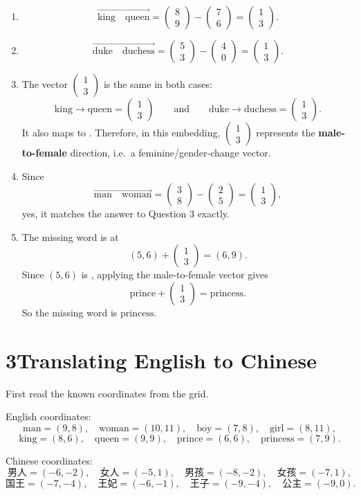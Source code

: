 \documentclass[12pt]{ctexart}
\newcommand{\overarrow}[1]{\overrightarrow{#1}}
\newcommand{\colvec}[2]{\begin{pmatrix} #1 \\ #2 \end{pmatrix}}
\begin{document}
\begin{enumerate}[label=\textbf{\arabic*.}]
\item \[
\overarrow{\text{king}\quad\text{queen}}
=\colvec{8}{9}-\colvec{7}{6}
=\colvec{1}{3}.
\]

\item \[
\overarrow{\text{duke}\quad\text{duchess}}
=\colvec{5}{3}-\colvec{4}{0}
=\colvec{1}{3}.
\]

\item The vector \(\colvec{1}{3}\) is the same in both cases:
\[
\text{king}\to\text{queen}=\colvec{1}{3}
\qquad\text{and}\qquad
\text{duke}\to\text{duchess}=\colvec{1}{3}.
\]
It also maps  to . Therefore, in this embedding, \(\colvec{1}{3}\) represents the \textbf{male-to-female} direction, i.e.\ a feminine/gender-change vector.

\item Since
\[
\overarrow{\text{man}\quad\text{woman}}
=\colvec{3}{8}-\colvec{2}{5}
=\colvec{1}{3},
\]
yes, it matches the answer to Question 3 exactly.

\item The missing word is at
\[
(5,6)+\colvec{1}{3}=(6,9).
\]
Since \((5,6)\) is , applying the male-to-female vector gives
\[
\text{prince}+\colvec{1}{3}=\text{princess}.
\]
So the missing word is \(\boxed{\text{princess}}\).
\end{enumerate}

\section*{3\quad Translating English to Chinese}

First read the known coordinates from the grid.

English coordinates:
\[
\text{man}=(9,8),\quad
\text{woman}=(10,11),\quad
\text{boy}=(7,8),\quad
\text{girl}=(8,11),
\]
\[
\text{king}=(8,6),\quad
\text{queen}=(9,9),\quad
\text{prince}=(6,6),\quad
\text{princess}=(7,9).
\]

Chinese coordinates:
\[
\text{男人}=(-6,-2),\quad
\text{女人}=(-5,1),\quad
\text{男孩}=(-8,-2),\quad
\text{女孩}=(-7,1),
\]
\[
\text{国王}=(-7,-4),\quad
\text{王妃}=(-6,-1),\quad
\text{王子}=(-9,-4),\quad
\text{公主}=(-9,0).
\]
\end{document}
